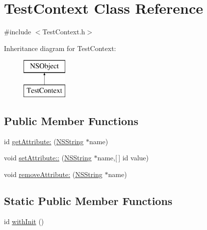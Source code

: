 \hypertarget{interface_test_context}{
\section{\-Test\-Context \-Class \-Reference}
\label{interface_test_context}
}


{\ttfamily \#include $<$\-Test\-Context.\-h$>$}

\-Inheritance diagram for \-Test\-Context\-:\begin{figure}[H]
\begin{center}
\leavevmode
\includegraphics[height=2.000000cm]{interface_test_context}
\end{center}
\end{figure}
\subsection*{\-Public \-Member \-Functions}
\begin{DoxyCompactItemize}
\item 
id \hyperlink{interface_test_context_a278c4b78ecead967d806a29d6e39acad}{get\-Attribute\-:} (\hyperlink{class_n_s_string}{\-N\-S\-String} $\ast$name)
\item 
void \hyperlink{interface_test_context_a89e652dbd1543804e1fdc41e5ef2f010}{set\-Attribute\-::} (\hyperlink{class_n_s_string}{\-N\-S\-String} $\ast$name,\mbox{[}$\,$\mbox{]} id value)
\item 
void \hyperlink{interface_test_context_afba71cc3017f86d34557464944625a90}{remove\-Attribute\-:} (\hyperlink{class_n_s_string}{\-N\-S\-String} $\ast$name)
\end{DoxyCompactItemize}
\subsection*{\-Static \-Public \-Member \-Functions}
\begin{DoxyCompactItemize}
\item 
id \hyperlink{interface_test_context_a9c0debca8e7e32492502399ce3cdc6bf}{with\-Init} ()
\end{DoxyCompactItemize}


